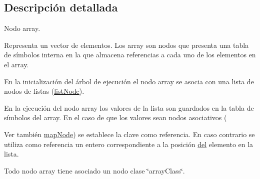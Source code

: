 \subsection{Descripción detallada}
Nodo array. 

Representa un vector de elementos. Los array son nodos que presenta una tabla de símbolos interna en la que almacena referencias a cada uno de los elementos en el array.

En la inicialización del árbol de ejecución el nodo array se asocia con una lista de nodos de listas (\hyperlink{classlistNode}{list\-Node}).

En la ejecución del nodo array los valores de la lista son guardados en la tabla de símbolos del array. En el caso de que los valores sean nodos asociativos (\begin{DoxySeeAlso}{Ver también}
\hyperlink{classmapNode}{map\-Node}) se establece la clave como referencia. En caso contrario se utiliza como referencia un entero correspondiente a la posición \hyperlink{classarrayNode_a15ff4fc8cc43321084be7c38f9e9ae43}{del} elemento en la lista.
\end{DoxySeeAlso}
Todo nodo array tiene asociado un nodo clase \char`\"{}array\-Class\char`\"{}. 

